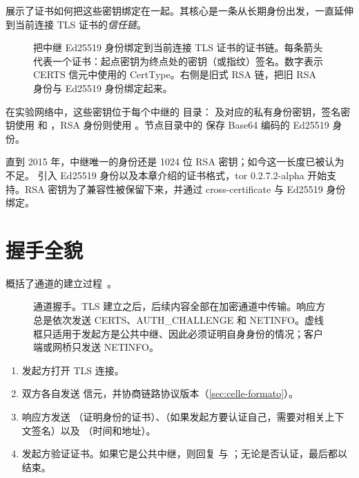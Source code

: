  展示了证书如何把这些密钥绑定在一起。其核心是一条从长期身份出发，一直延伸到当前连接 TLS 证书的\emph{信任链}。

\begin{figure}[htbp]
\centering

\caption{把中继 Ed25519 身份绑定到当前连接 TLS 证书的证书链。每条箭头代表一个证书：起点密钥为终点处的密钥（或指纹）签名。数字表示 CERTS 信元中使用的 CertType。右侧是旧式 RSA 链，把旧 RSA 身份与 Ed25519 身份绑定起来。}
\label{fig:chiavi-relay}
\end{figure}

在实验网络中，这些密钥位于每个中继的  目录： 及对应的私有身份密钥，签名密钥使用  和 ，RSA 身份则使用 。节点目录中的  保存 Base64 编码的 Ed25519 身份。

\begin{storia}[从 RSA 到 Ed25519]
直到 2015 年，中继唯一的身份还是 1024 位 RSA 密钥；如今这一长度已被认为不足。 引入 Ed25519 身份以及本章介绍的证书格式，tor 0.2.7.2-alpha 开始支持。RSA 密钥为了兼容性被保留下来，并通过 cross-certificate 与 Ed25519 身份绑定。
\end{storia}

\section{握手全貌}\label{sec:canale-handshake}

 概括了通道的建立过程~。

\begin{figure}[htbp]
\centering

\caption{通道握手。TLS 建立之后，后续内容全部在加密通道中传输。响应方总是依次发送 CERTS、AUTH\_CHALLENGE 和 NETINFO。虚线框只适用于发起方是公共中继、因此必须证明自身身份的情况；客户端或网桥只发送 NETINFO。}
\label{fig:handshake-canale}
\end{figure}

\begin{enumerate}
  \item 发起方打开 TLS 连接。
  \item 双方各自发送  信元，并协商链路协议版本（\cref{sec:celle-formato}）。
  \item 响应方发送 （证明身份的证书）、（如果发起方要认证自己，需要对相关上下文签名）以及 （时间和地址）。
  \item 发起方验证证书。如果它是公共中继，则回复  与 ；无论是否认证，最后都以  结束。
\end{enumerate}

